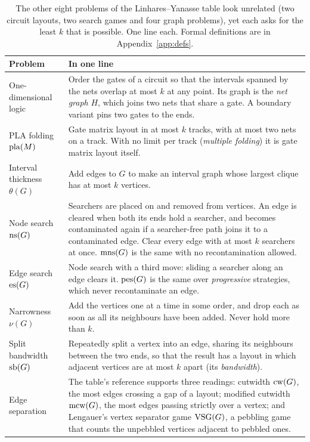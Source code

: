 \begin{table}[tbp]
\centering\small
\caption{The other eight problems of the Linhares--Yanasse table look
unrelated (two circuit layouts, two search games and four graph problems), yet
each asks for the least $k$ that is possible. One line each. Formal definitions are in
Appendix~\ref{app:defs}.}
\label{tab:problems}
\begin{tabularx}{\linewidth}{@{}>{\raggedright}p{3.6cm}>{\raggedright\arraybackslash}X@{}}
\toprule
Problem & In one line \\
\midrule
One-dimensional logic & Order the gates of a circuit so that the intervals
  spanned by the nets overlap at most $k$ at any point. Its graph is the
  \emph{net graph} $H$, which joins two nets that share a gate. A boundary
  variant pins two gates to the ends. \\
PLA folding $\mathrm{pla}(M)$ & Gate matrix layout in at most $k$ tracks, with at most
  two nets on a track. With no limit per track (\emph{multiple folding}) it is
  gate matrix layout itself. \\
Interval thickness $\theta(G)$ & Add edges to $G$ to make an interval graph
  whose largest clique has at most $k$ vertices. \\
Node search $\mathrm{ns}(G)$ & Searchers are placed on and removed from vertices. An
  edge is cleared when both its ends hold a searcher, and becomes contaminated
  again if a searcher-free path joins it to a contaminated edge. Clear every
  edge with at most $k$ searchers at once. $\mathrm{mns}(G)$ is the same with no
  recontamination allowed. \\
Edge search $\mathrm{es}(G)$ & Node search with a third move: sliding a searcher along
  an edge clears it. $\mathrm{pes}(G)$ is the same over \emph{progressive} strategies,
  which never recontaminate an edge. \\
Narrowness $\nu(G)$ & Add the vertices one at a time in some order, and drop
  each as soon as all its neighbours have been added. Never hold more than $k$. \\
Split bandwidth $\mathrm{sb}(G)$ & Repeatedly split a vertex into an edge, sharing its
  neighbours between the two ends, so that the result has a layout in which
  adjacent vertices are at most $k$ apart (its \emph{bandwidth}). \\
Edge separation & The table's reference \citep{LY2002ref14} supports three
  readings: cutwidth $\mathrm{cw}(G)$, the most edges crossing a gap of a layout;
  modified cutwidth $\mathrm{mcw}(G)$, the most edges passing strictly over a vertex;
  and Lengauer's vertex separator game $\mathrm{VSG}(G)$, a pebbling game that counts
  the unpebbled vertices adjacent to pebbled ones. \\
\bottomrule
\end{tabularx}
\end{table}

